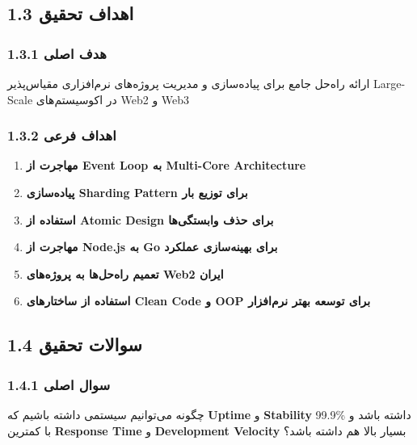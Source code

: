 \documentclass[
]{article}
\providecommand{\tightlist}{%
  \setlength{\itemsep}{0pt}\setlength{\parskip}{0pt}}
\begin{document}
\subsection{1.3 اهداف
تحقیق}\label{ux627ux647ux62fux627ux641-ux62aux62dux642ux6ccux642}

\subsubsection{1.3.1 هدف
اصلی}\label{ux647ux62fux641-ux627ux635ux644ux6cc}

ارائه راه‌حل جامع برای پیاده‌سازی و مدیریت پروژه‌های نرم‌افزاری مقیاس‌پذیر
Large-Scale در اکوسیستم‌های Web2 و Web3

\subsubsection{1.3.2 اهداف
فرعی}\label{ux627ux647ux62fux627ux641-ux641ux631ux639ux6cc}

\begin{enumerate}
\def\labelenumi{\arabic{enumi}.}
\tightlist
\item
  \textbf{مهاجرت از Event Loop به Multi-Core Architecture}
\item
  \textbf{پیاده‌سازی Sharding Pattern برای توزیع بار}
\item
  \textbf{استفاده از Atomic Design برای حذف وابستگی‌ها}
\item
  \textbf{مهاجرت از Node.js به Go برای بهینه‌سازی عملکرد}
\item
  \textbf{تعمیم راه‌حل‌ها به پروژه‌های Web2 ایران}
\item
  \textbf{استفاده از ساختارهای Clean Code و OOP برای توسعه بهتر
  نرم‌افزار}
\end{enumerate}

\subsection{1.4 سوالات
تحقیق}\label{ux633ux648ux627ux644ux627ux62a-ux62aux62dux642ux6ccux642}

\subsubsection{1.4.1 سوال
اصلی}\label{ux633ux648ux627ux644-ux627ux635ux644ux6cc}

چگونه می‌توانیم سیستمی داشته باشیم که \textbf{Uptime} و
\textbf{Stability} 99.9\% داشته باشد و با کمترین \textbf{Response Time}
و \textbf{Development Velocity} بسیار بالا هم داشته باشد؟
\end{document}
